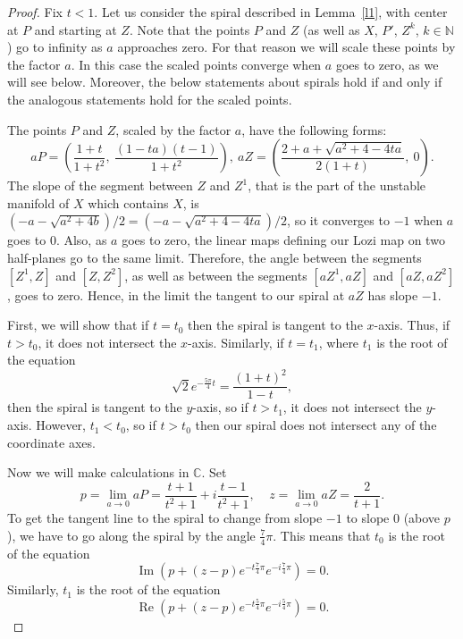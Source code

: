 \documentclass[10pt,a4paper]{amsart}
\def\N{{\mathbb N}}
\newcommand{\C}{\mathbb{C}}
\newcommand{\im}{\operatorname{Im}}
\newcommand{\re}{\operatorname{Re}}
\begin{document}
	\begin{proof}
		Fix $t < 1$. Let us consider the spiral described in Lemma~\ref{l1}, 
		with center at $P$ and starting at $Z$. Note that the points $P$ 
		and $Z$ (as well as $X$, $P'$, $Z^k$, $k \in \N$) go to infinity as 
		$a$ approaches zero. For that reason we will scale these points by 
		the factor $a$. In this case the scaled points converge when $a$ goes 
		to zero, as we will see below. Moreover, the below statements about 
		spirals hold if and only if the analogous statements hold for the 
		scaled points. 
		
		The points $P$ and $Z$, scaled by the factor $a$, have the following 
		forms:
		$$aP = \left(\frac{1+t}{1 + t^2}, \ \frac{(1 - ta)(t-1)}{1 + t^2}\right), 
		\ aZ = \left( \frac{2 + a + \sqrt{a^2 + 4 - 4ta}}{2(1 + t)}, \ 0 \right).
		$$ 
		The slope of the segment between $Z$ and $Z^1$, that is the part of the 
		unstable manifold of $X$ which contains $X$, is
		$(-a - \sqrt{a^2 + 4b})/2 = (-a - \sqrt{a^2 + 4 - 4ta})/2$, so it 
		converges to $-1$ when $a$ goes to $0$. Also, as $a$ goes to zero, the 
		linear maps defining our Lozi map on two half-planes go to the same limit. 
		Therefore, the angle between the segments $[Z^1, Z]$ and $[Z, Z^2]$, as 
		well as between the segments $[aZ^1, aZ]$ and $[aZ, aZ^2]$, goes to zero. 
		Hence, in the limit the tangent to our spiral at $aZ$ has slope $-1$. 	
		
		First, we will show that if $t = t_0$ then the spiral is tangent to the 
		$x$-axis. Thus, if $t > t_0$, it does not intersect the $x$-axis. 
		Similarly, if $t = t_1$, where $t_1$ is the root of the equation
		\begin{equation}\label{e2}
			\sqrt{2} e^{-\frac{5\pi}{4}t} = \frac{(1 + t)^2}{1 - t},
		\end{equation}
		then the spiral is tangent to the $y$-axis, so if $t  > t_1$, it does not
		intersect the $y$-axis. However, $t_1 < t_0$, so if $t > t_0$ then our
		spiral does not intersect any of the coordinate axes.
		
		Now we will make calculations in $\C$. Set
		\[
		p = \lim_{a \to 0}aP = \frac{t + 1}{t^2 + 1} + i\frac{t - 1}{t^2 + 1},
		\ \ \ \ \ z = \lim_{a \to 0}aZ = \frac2{t + 1}.
		\]
		To get the tangent line to the spiral to change from slope $-1$ to slope 
		$0$ (above $p$), we have to go along the spiral by the angle $\frac74\pi$. 
		This means that $t_0$ is the root of the equation
		\begin{equation}\label{e3}
			\im\left(p + (z - p)e^{-t \frac74 \pi}e^{-i \frac74 \pi}\right) = 0.
		\end{equation}
		Similarly, $t_1$ is the root of the equation
		\begin{equation}\label{e4}
			\re\left(p + (z - p)e^{-t \frac54 \pi}e^{-i \frac54 \pi}\right) = 0.
		\end{equation}
		

\end{proof}
\end{document}
